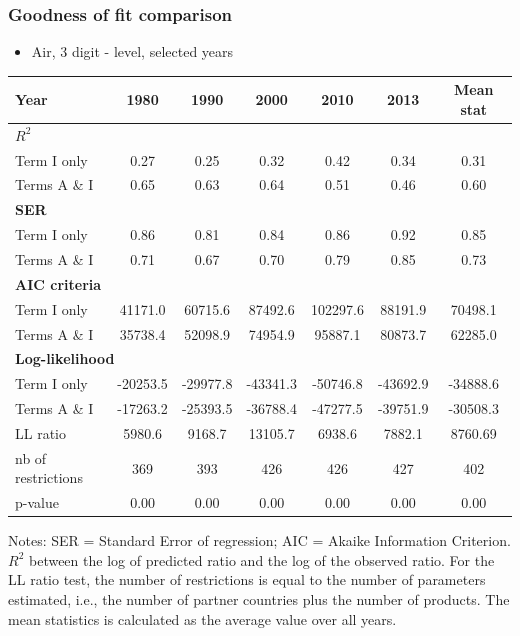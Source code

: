 \documentclass[10 pt,Helvetica, french]{beamer}
\begin{document}
\begin{frame}
\frametitle{Goodness of fit comparison}
\begin{itemize}
\item Air, 3 digit - level, selected years
\end{itemize}
\begin{table}[htbp]
  \centering
  \scriptsize{
\begin{center}
    \begin{tabular}{l|ccccc|c}
    \hline \hline
    Year  &1980  & 1990  & 2000  & 2010 & 2013 & Mean stat \\ \hline
    \multicolumn{7}{l}{\bf{$R^2$} }\\ \hline
    Term I only &  0.27  & 0.25  & 0.32  & 0.42 & 0.34 & 0.31 \\
    Terms A \& I &  0.65  & 0.63  & 0.64  & 0.51 & 0.46 & 0.60 \\ \hline
    \multicolumn{7}{l}{\textbf{SER}  }  \\ \hline
    Term I only &  0.86  & 0.81  & 0.84  & 0.86 & 0.92 & 0.85 \\
    Terms A \& I &  0.71  & 0.67  & 0.70  & 0.79 & 0.85 & 0.73 \\ \hline
   \multicolumn{7}{l}{\textbf{AIC criteria}}  \\ \hline
    Term I only &  41171.0 & 60715.6 & 87492.6 & 102297.6 & 88191.9 & 70498.1 \\
    Terms A \& I & 35738.4 & 52098.9 & 74954.9 & 95887.1 & 80873.7 & 62285.0 \\ \hline
    \multicolumn{7}{l}{\textbf{Log-likelihood}} \\ \hline
    Term I only &  -20253.5 & -29977.8 & -43341.3 & -50746.8 & -43692.9 & -34888.6 \\
    Terms A \& I &  -17263.2 & -25393.5 & -36788.4 & -47277.5 & -39751.9 & -30508.3 \\
    LL ratio &  5980.6 & 9168.7 & 13105.7 & 6938.6 & 7882.1 & 8760.69 \\
    nb of restrictions & 369   & 393   & 426   & 426 & 427 & 402 \\
    p-value & 0.00 & 0.00 & 0.00 & 0.00 & 0.00 & 0.00 \\
    \hline \hline
 \end{tabular}%
    \end{center}}
  \label{tab:good_fit_air}%
 \parbox[l]{10cm}{\tiny{Notes: SER = Standard Error of regression; AIC = Akaike Information Criterion. $R^{2}$ between the log of predicted ratio and the log of the observed ratio. For the LL ratio test, the number of restrictions is equal to the number of parameters estimated, i.e., the number of partner countries plus the number of products. The mean statistics is calculated as the average value over all years. }}
\end{table}%
\hyperlink{slide_result2}{}
\end{frame}
\end{document}
